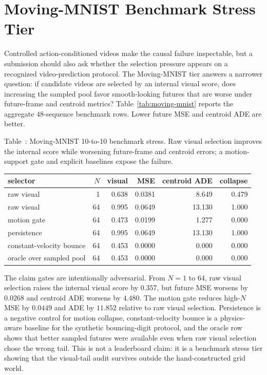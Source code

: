 \documentclass{article}
\begin{document}
\clearpage

\section{Moving-MNIST Benchmark Stress Tier}

Controlled action-conditioned videos make the causal failure inspectable, but a submission should also ask whether the selection pressure appears on a recognized video-prediction protocol. The Moving-MNIST tier answers a narrower question: if candidate videos are selected by an internal visual score, does increasing the sampled pool favor smooth-looking futures that are worse under future-frame and centroid metrics? Table~\ref{tab:moving-mnist} reports the aggregate \(48\)-sequence benchmark rows. Lower future MSE and centroid ADE are better.

\begin{center}
  \label{tab:moving-mnist}
  \small
  Table~\thetable: Moving-MNIST 10-to-10 benchmark stress. Raw visual selection improves the internal score while worsening future-frame and centroid errors; a motion-support gate and explicit baselines expose the failure.

  \vspace{0.4em}
  \begin{tabular}{@{}lrrrrr@{}}
    \toprule
    selector & \(N\) & visual & MSE & centroid ADE & collapse \\
    \midrule
    raw visual & 1 & 0.638 & 0.0381 & 8.649 & 0.479 \\
    raw visual & 64 & 0.995 & 0.0649 & 13.130 & 1.000 \\
    motion gate & 64 & 0.473 & 0.0199 & 1.277 & 0.000 \\
    persistence & 64 & 0.995 & 0.0649 & 13.130 & 1.000 \\
    constant-velocity bounce & 64 & 0.453 & 0.0000 & 0.000 & 0.000 \\
    oracle over sampled pool & 64 & 0.453 & 0.0000 & 0.000 & 0.000 \\
    \bottomrule
  \end{tabular}
\end{center}

The claim gates are intentionally adversarial. From \(N=1\) to \(64\), raw visual selection raises the internal visual score by \(0.357\), but future MSE worsens by \(0.0268\) and centroid ADE worsens by \(4.480\). The motion gate reduces high-\(N\) MSE by \(0.0449\) and ADE by \(11.852\) relative to raw visual selection. Persistence is a negative control for motion collapse, constant-velocity bounce is a physics-aware baseline for the synthetic bouncing-digit protocol, and the oracle row shows that better sampled futures were available even when raw visual selection chose the wrong tail. This is not a leaderboard claim: it is a benchmark stress tier showing that the visual-tail audit survives outside the hand-constructed grid world.
\end{document}
